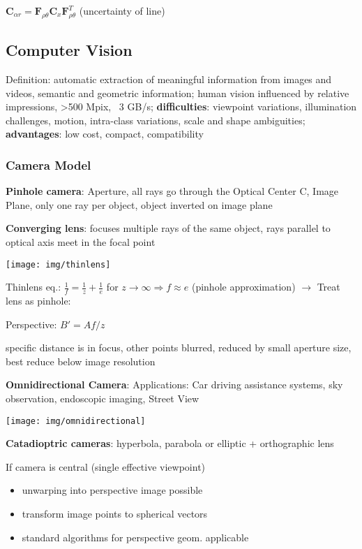 \documentclass[fontsize=6pt]{scrartcl}
\newcommand{\mat}[1]{\mathbf{#1}}
\begin{document}
\begin{multicols*}{4}
$\mat C_{\alpha r} = \mat F_{\rho \theta} \mat C_x \mat F_{\rho \theta}^T$ (uncertainty of line)

\subsection*{Computer Vision}

Definition: automatic extraction of meaningful information from images and videos, semantic and geometric information;
human vision influenced by relative impressions, >500 Mpix, ~3 GB/s;
\textbf{difficulties}: viewpoint variations, illumination challenges, motion, intra-class variations, scale and shape ambiguities;
\textbf{advantages}:	low cost, compact, compatibility


\subsubsection*{Camera Model}

\textbf{Pinhole camera}: Aperture, all rays go through the Optical Center C, Image Plane, only one ray per object, object inverted on image plane

\textbf{Converging lens}: focuses multiple rays of the same object, rays parallel to optical axis meet in the focal point


\begin{minipage}{0.6\linewidth}
	\texttt{[image: img/thinlens]}
\end{minipage}
\begin{minipage}{0.4\linewidth}
	Thinlens eq.: $ \frac{1}{f} = \frac{1}{z} + \frac{1}{e}$ for $z \rightarrow \infty \Rightarrow f \approx e$ (pinhole approximation) $\rightarrow$ Treat lens as pinhole:

	Perspective: $B' = A  f/z$

\end{minipage}
specific distance is in focus, other points blurred, reduced by small aperture size, best reduce below image resolution

\textbf{Omnidirectional Camera}: Applications: Car driving assistance systems, sky observation, endoscopic imaging, Street View
{\centering
\texttt{[image: img/omnidirectional]}
\par}
\textbf{Catadioptric cameras}:
hyperbola, parabola or elliptic + orthographic lens

If camera is central (single effective viewpoint)
\begin{itemize}
\item unwarping into perspective image possible
\item transform image points to spherical vectors
\item standard algorithms for perspective geom. applicable
\end{itemize}


\end{multicols*}
\end{document}
